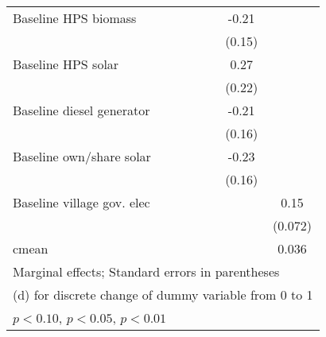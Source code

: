 \begin{table}[htbp]
\begin{tabular*}{1\hsize}{@{\hskip\tabcolsep\extracolsep\fill}l*{6}{c}}
Baseline HPS biomass&                  &                  &                  &                  &    -0.21         &                  \\
                &                  &                  &                  &                  &   (0.15)         &                  \\
Baseline HPS solar&                  &                  &                  &                  &     0.27         &                  \\
                &                  &                  &                  &                  &   (0.22)         &                  \\
Baseline diesel generator&                  &                  &                  &                  &    -0.21         &                  \\
                &                  &                  &                  &                  &   (0.16)         &                  \\
Baseline own/share solar&                  &                  &                  &                  &    -0.23         &                  \\
                &                  &                  &                  &                  &   (0.16)         &                  \\
Baseline village gov. elec&                  &                  &                  &                  &                  &     0.15\sym{**} \\
                &                  &                  &                  &                  &                  &  (0.072)         \\
\midrule
cmean           &                  &                  &                  &                  &                  &    0.036         \\
\bottomrule
\multicolumn{7}{l}{\footnotesize Marginal effects; Standard errors in parentheses}\\
\multicolumn{7}{l}{\footnotesize  (d) for discrete change of dummy variable from 0 to 1}\\
\multicolumn{7}{l}{\footnotesize \sym{*} \(p<0.10\), \sym{**} \(p<0.05\), \sym{***} \(p<0.01\)}\\
\end{tabular*}
\end{table}

